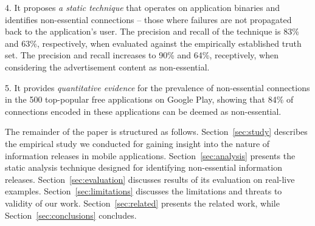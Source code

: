\vspace{0.05in}
4.
It proposes \emph{a static technique} that operates on application binaries and identifies non-essential connections -- those where failures are not propagated back to the application's user. The precision and recall of the technique is 83\% and 63\%, respectively, when evaluated against the empirically established truth set. 
The precision and recall increases to 90\% and 64\%, receptively, when considering the advertisement content as non-essential.

\vspace{0.05in}
5.
It provides \emph{quantitative evidence} for the prevalence of non-essential connections in the 500 top-popular free applications on Google Play, showing that 84\% of connections encoded in these applications can be deemed as non-essential.

\vspace{0.05in}
The remainder of the paper is structured as follows. Section~\ref{sec:study} describes the empirical study we conducted for gaining insight into the nature of information releases in mobile applications. Section~\ref{sec:analysis} presents the static analysis technique designed for identifying non-essential information releases. 
Section~\ref{sec:evaluation} discusses results of its evaluation on real-live examples. Section~\ref{sec:limitations} discusses the limitations and threats to validity of our work. Section~\ref{sec:related} presents the related work, while Section~\ref{sec:conclusions} concludes. 




